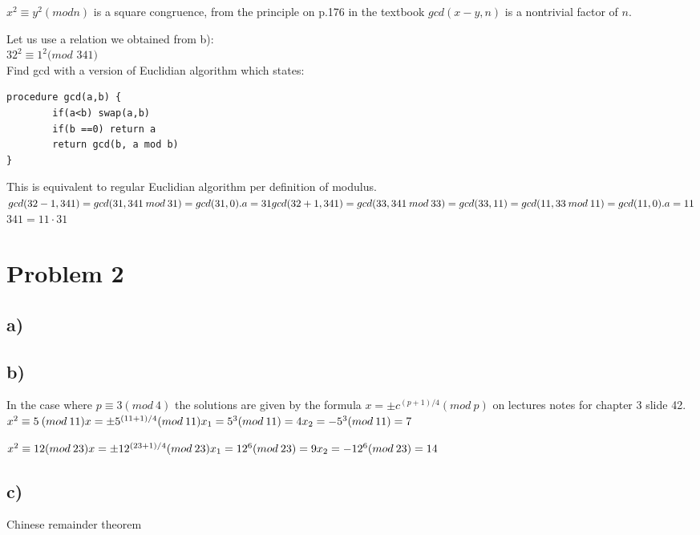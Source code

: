 \documentclass{article}
\begin{document}
$x^{2} \equiv y^{2} (mod n)$ is a square congruence, from the principle on p.176 in the textbook $gcd(x-y,n)$ is a nontrivial factor of $n$.

Let us use a relation we obtained from b):\\
$32^{2} \equiv 1^{2} (mod$ $341)$\\
Find gcd with a version of Euclidian algorithm which states: 
\begin{verbatim}
procedure gcd(a,b) {
		if(a<b) swap(a,b)
		if(b ==0) return a
		return gcd(b, a mod b)
}
\end{verbatim}
This is equivalent to regular Euclidian algorithm per definition of modulus.
$
gcd(32-1, 341) = gcd(31, 341 \: mod \: 31) =  gcd(31,0). a = 31\\
gcd(32+1, 341) = gcd(33, 341 \: mod \: 33) =  gcd(33,11) = gcd(11, 33 \: mod \: 11) = gcd(11,0). a = 11\\
$
$341 = 11 \cdotp 31$

\section*{Problem 2}

\subsection*{a)}


\subsection*{b)}

In the case where $p \equiv 3(mod \: 4)$ the solutions are given by the formula $x = \pm c^{(p+1)/4} (mod\:p)$ on lectures notes for chapter 3 slide 42.\\
$
x^{2} \equiv 5\:(mod \: 11)\\
x = \pm 5^{(11+1)/4}(mod \: 11)\\
x_{1} = 5^{3}(mod \: 11) = 4\\
x_{2} = -5^{3}(mod \: 11) = 7
$

$
x^{2} \equiv 12(mod \: 23)\\
x = \pm 12^{(23+1)/4}(mod \: 23)\\
x_{1} = 12^{6}(mod \: 23) = 9\\
x_{2} = -12^{6}(mod \: 23) = 14
$

\subsection*{c)}
Chinese remainder theorem
\end{document}
